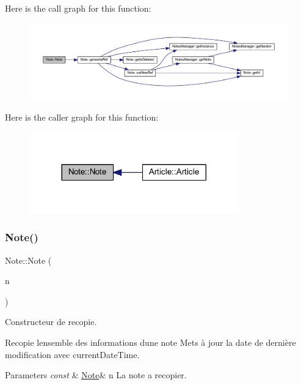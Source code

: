 Here is the call graph for this function\+:\nopagebreak
\begin{figure}[H]
\begin{center}
\leavevmode
\includegraphics[width=350pt]{class_note_a0490153115307d5f59974d7000260e48_cgraph}
\end{center}
\end{figure}
Here is the caller graph for this function\+:\nopagebreak
\begin{figure}[H]
\begin{center}
\leavevmode
\includegraphics[width=257pt]{class_note_a0490153115307d5f59974d7000260e48_icgraph}
\end{center}
\end{figure}
\mbox{\label{class_note_ac06fd282c05bbfe2e1675fe0677b2efb}} 
\subsubsection{\texorpdfstring{Note()}{Note()}\hspace{0.1cm}{\footnotesize\ttfamily [2/2]}}
{\footnotesize\ttfamily Note\+::\+Note (\begin{DoxyParamCaption}\item[{const \hyperlink{class_note}{Note} \&}]{n }\end{DoxyParamCaption})}



Constructeur de recopie. 

Recopie l\textquotesingle{}ensemble des informations d\textquotesingle{}une note Mets à jour la date de dernière modification avec current\+Date\+Time. 
\begin{DoxyParams}{Parameters}
{\em const} & \hyperlink{class_note}{Note}\& n La note a recopier. \\
\hline
\end{DoxyParams}


